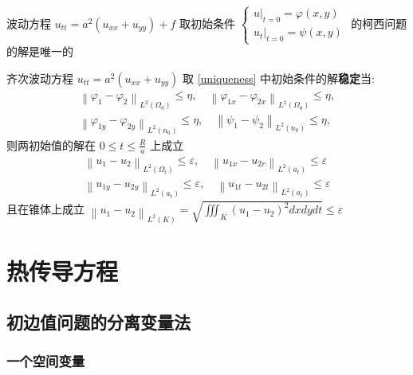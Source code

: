 \documentclass[10pt]{yerbaformat}
\begin{document}
\begin{theorem}
    波动方程 $u_{tt}=a^{2}\left(u_{xx}+u_{y y}\right)+f$ 取初始条件 $\left\{\begin{array}{l}\left.u\right|_{t=0}=\varphi(x, y) \\ \left.u_{t}\right|_{t=0}=\psi(x, y)\end{array}\right.$ 的柯西问题的解是唯一的 \label{uniqueness}
\end{theorem}

\begin{theorem}
    齐次波动方程 $u_{tt}=a^{2}\left(u_{xx}+u_{y y}\right)$ 取 \ref{uniqueness} 中初始条件的解\textbf{稳定}当:
    $$
        \begin{array}{l}
            \left\|\varphi_{1}-\varphi_{2}\right\|_{L^{2}\left(\Omega_{0}\right)} \leqslant \eta, \quad\left\|\varphi_{1 x}-\varphi_{2 x}\right\|_{L^{2}\left(\Omega_{0}\right)} \leqslant \eta, \\
            \left\|\varphi_{1 y}-\varphi_{2 y}\right\|_{L^{2}\left(n_{0}\right)} \leqslant \eta, \quad\left\|\psi_{1}-\psi_{2}\right\|_{L^{2}\left(n_{0}\right)} \leqslant \eta,
        \end{array}
    $$
    则两初始值的解在 $0 \leqslant t \leqslant \frac{R}{a}$ 上成立
    $$
        \begin{array}{l}
            \left\|u_{1}-u_{2}\right\|_{L^{2}\left(\Omega_{t}\right)} \leqslant \varepsilon, \quad\left\|u_{1 x}-u_{2 r}\right\|_{L^{2}\left(a_{t}\right)} \leqslant \varepsilon \\
            \left\|u_{1 y}-u_{2 y}\right\|_{L^{2}\left(a_{t}\right)} \leqslant \varepsilon, \quad\left\|u_{1 t}-u_{2 t}\right\|_{L^{2}\left(a_{t}\right)} \leqslant \varepsilon
        \end{array}
    $$
    且在锥体上成立 $\left\|u_{1}-u_{2}\right\|_{L^{2}(K)}=\sqrt{\iiint_{K}\left(u_{1}-u_{2}\right)^{2} d x d y d t} \leqslant \varepsilon$
\end{theorem}

\section{热传导方程}

\subsection{初边值问题的分离变量法}
\subsubsection{一个空间变量}
\end{document}
